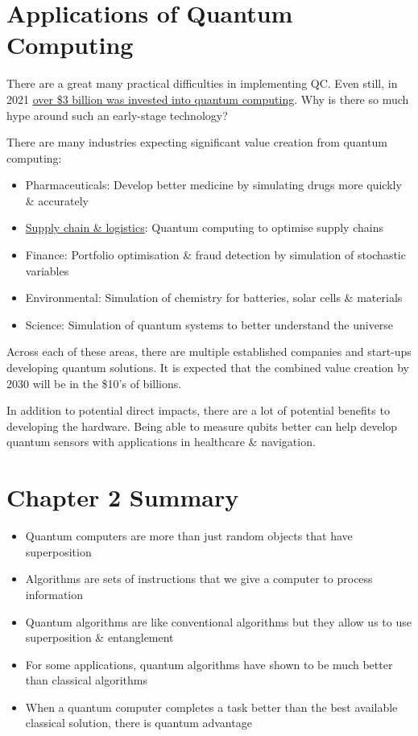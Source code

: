 \documentclass{book}
\begin{document}
\section{Applications of Quantum Computing}

There are a great many practical difficulties in implementing QC. Even still, in 2021 \href{https://www.mckinsey.com/business-functions/mckinsey-digital/our-insights/quantum-computing-funding-remains-strong-but-talent-gap-raises-concern}{over \$3 billion was invested into quantum computing}. Why is there so much hype around such an early-stage technology? 

There are many industries expecting significant value creation from quantum computing: 

\begin{itemize}
        
    \item Pharmaceuticals: Develop better medicine by simulating drugs more quickly \& accurately  
    \item \hyperlink{https://www.youtube.com/watch?v=jA7iopqDm94}{Supply chain \& logistics}: Quantum computing to optimise supply chains 
    \item Finance: Portfolio optimisation \& fraud detection by simulation of stochastic variables
    \item Environmental: Simulation of chemistry for batteries, solar cells \& materials
    \item Science: Simulation of quantum systems to better understand the universe
    
\end{itemize}


Across each of these areas, there are multiple established companies and start-ups developing quantum solutions. It is expected that the combined value creation by 2030 will be in the \$10's of billions. 

In addition to potential direct impacts, there are a lot of potential benefits to developing the hardware. Being able to measure qubits better can help develop quantum sensors with applications in healthcare \& navigation. 


\section{Chapter 2 Summary}
\begin{itemize}
    \item Quantum computers are more than just random objects that have superposition
    \item Algorithms are sets of instructions that we give a computer to process information 
    \item Quantum algorithms are like conventional algorithms but they allow us to use superposition \& entanglement 
    \item For some applications, quantum algorithms have shown to be much better than classical algorithms
    \item When a quantum computer completes a task better than the best available classical solution, there is quantum advantage
\end{itemize}
\end{document}

